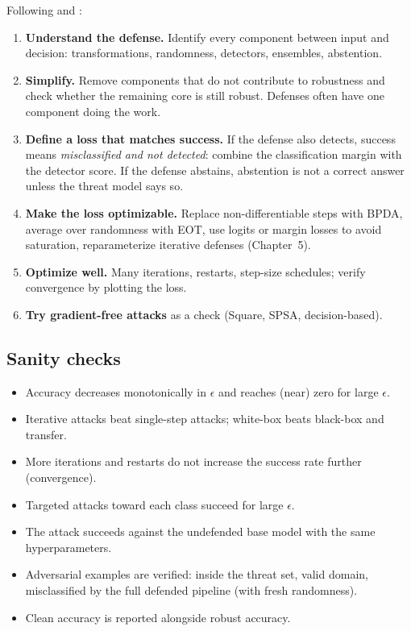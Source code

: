 \documentclass[10pt,a4paper]{extarticle}
\theoremstyle{definition}
\begin{document}
Following \citet{tramer2020adaptive} and \citet{carlini2019evaluating}:
\begin{enumerate}
  \item \textbf{Understand the defense.} Identify every component between input and decision: transformations, randomness, detectors, ensembles, abstention.
  \item \textbf{Simplify.} Remove components that do not contribute to robustness and check whether the remaining core is still robust. Defenses often have one component doing the work.
  \item \textbf{Define a loss that matches success.} If the defense also detects, success means \emph{misclassified and not detected}: combine the classification margin with the detector score. If the defense abstains, abstention is not a correct answer unless the threat model says so.
  \item \textbf{Make the loss optimizable.} Replace non-differentiable steps with BPDA, average over randomness with EOT, use logits or margin losses to avoid saturation, reparameterize iterative defenses (Chapter~5).
  \item \textbf{Optimize well.} Many iterations, restarts, step-size schedules; verify convergence by plotting the loss.
  \item \textbf{Try gradient-free attacks} as a check (Square, SPSA, decision-based).
\end{enumerate}

\subsection{Sanity checks}

\begin{keybox}
\begin{itemize}
  \item Accuracy decreases monotonically in \(\epsilon\) and reaches (near) zero for large \(\epsilon\).
  \item Iterative attacks beat single-step attacks; white-box beats black-box and transfer.
  \item More iterations and restarts do not increase the success rate further (convergence).
  \item Targeted attacks toward each class succeed for large \(\epsilon\).
  \item The attack succeeds against the undefended base model with the same hyperparameters.
  \item Adversarial examples are verified: inside the threat set, valid domain, misclassified by the full defended pipeline (with fresh randomness).
  \item Clean accuracy is reported alongside robust accuracy.
\end{itemize}
\end{keybox}
\end{document}

